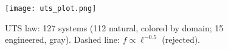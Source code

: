\begin{figure}[h]
\centering
\texttt{[image: uts\_plot.png]}
\caption{UTS law: 127 systems (112 natural, colored by domain; 15 engineered, gray). Dashed line: $f \propto \ell^{-0.5}$ (rejected).}
\end{figure}

